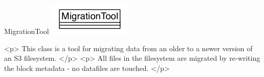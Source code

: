 \begin{XeClass}{MigrationTool}
\includegraphics[width=\textwidth]{cdig/MigrationTool.png}
     
 <p>
 This class is a tool for migrating data from an older to a newer version
 of an S3 filesystem.
 </p>
 <p>
 All files in the filesystem are migrated by re-writing the block metadata
 - no datafiles are touched.
 </p>



\end{XeClass}
